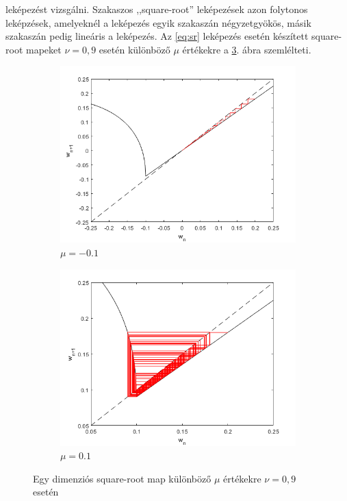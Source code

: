 \noindent leképezést vizsgálni. Szakaszos ,,square-root'' leképezések azon folytonos leképzések, amelyeknél a leképezés egyik szakaszán négyzetgyökös, másik szakaszán pedig lineáris a leképezés. Az \eqref{eq:sr} leképezés esetén készített square-root mapeket $\nu=0,9$ esetén különböző $\mu$ értékekre a \ref{fig:square-root}. ábra szemlélteti.


\begin{figure}[ht!]
\centering
\begin{subfigure}[b]{0.45\linewidth}
         \centering
         \includegraphics[width=1\linewidth]{graphics/sr_m01.png}
         \caption{$\mu=-0.1$}
         \label{fig:s_m01}
     \end{subfigure}
     \begin{subfigure}[b]{0.45\linewidth}
         \centering
         \includegraphics[width=1\linewidth]{graphics/sr_01.png}
         \caption{$\mu=0.1$}
         \label{fig:s_01}
     \end{subfigure}
     \caption{Egy dimenziós square-root map különböző $\mu$ értékekre $\nu=0,9$ esetén}\label{fig:square-root}
\end{figure}

